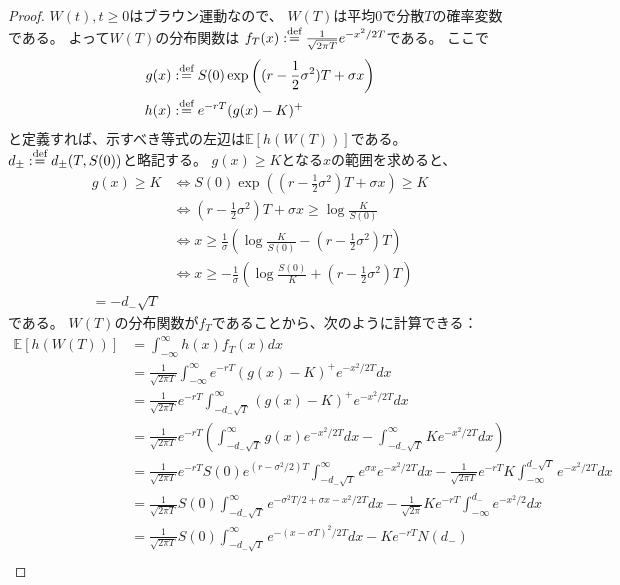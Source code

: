 \documentclass[uplatex]{jsarticle}
\theoremstyle{definition}
\def\E{\mathbb{E}}
\def\dfn{:\overset{\mbox{{\scriptsize def}}}{=}}
\begin{document}
\begin{proof}
  \(W(t) , t \geq 0\)はブラウン運動なので、
  \(W(T)\)は平均\(0\)で分散\(T\)の確率変数である。
  よって\(W(T)\)の分布関数は
  \(f_T(x) \dfn \frac{1}{\sqrt{2\pi T}}e^{-x^2/2T}\)である。
  ここで
  \begin{align*}
    g(x) &\dfn S(0)\exp\left( (r-\frac{1}{2}\sigma^2)T + \sigma x\right) \\
    h(x) &\dfn e^{-rT}(g(x) - K)^+
  \end{align*}
  と定義すれば、示すべき等式の左辺は\(\E[h(W(T))]\)である。
  \(d_{\pm} \dfn d_{\pm}(T,S(0))\)と略記する。
  \(g(x)\geq K\)となる\(x\)の範囲を求めると、
  \begin{align*}
    g(x)\geq K &\iff
    S(0)\exp\left( (r-\frac{1}{2}\sigma^2)T + \sigma x\right) \geq K \\
    &\iff (r-\frac{1}{2}\sigma^2)T + \sigma x
    \geq \log \frac{K}{S(0)} \\
    &\iff x \geq \frac{1}{\sigma}
    \left(\log \frac{K}{S(0)} - (r-\frac{1}{2}\sigma^2)T\right) \\
    &\iff x \geq -\frac{1}{\sigma}
    \left(\log \frac{S(0)}{K} + (r-\frac{1}{2}\sigma^2)T\right) \\
    = -d_-\sqrt{T}
  \end{align*}
  である。
  \(W(T)\)の分布関数が\(f_T\)であることから、次のように計算できる：
  \begin{align*}
    \E[h(W(T))] &= \int_{-\infty}^{\infty}h(x)f_T(x)dx \\
    &= \frac{1}{\sqrt{2\pi T}}\int_{-\infty}^{\infty}
    e^{-rT}(g(x) - K)^+e^{-x^2/2T}dx \\
    &= \frac{1}{\sqrt{2\pi T}}e^{-rT}\int_{-d_-\sqrt{T}}^{\infty}
    (g(x) - K)^+e^{-x^2/2T}dx \\
    &= \frac{1}{\sqrt{2\pi T}}e^{-rT}
    \left( \int_{-d_-\sqrt{T}}^{\infty}g(x)e^{-x^2/2T}dx
    - \int_{-d_-\sqrt{T}}^{\infty}Ke^{-x^2/2T}dx\right) \\
    &= \frac{1}{\sqrt{2\pi T}}e^{-rT}S(0)e^{(r-\sigma^2/2)T}
    \int_{-d_-\sqrt{T}}^{\infty}e^{\sigma x}e^{-x^2/2T}dx
    - \frac{1}{\sqrt{2\pi T}}e^{-rT}K
    \int_{-\infty}^{d_-\sqrt{T}}e^{-x^2/2T}dx \\
    &= \frac{1}{\sqrt{2\pi T}}S(0)
    \int_{-d_-\sqrt{T}}^{\infty}e^{-\sigma^2T/2 + \sigma x - x^2/2T}dx
    - \frac{1}{\sqrt{2\pi}}Ke^{-rT}
    \int_{-\infty}^{d_-}e^{-x^2/2}dx \\
    &= \frac{1}{\sqrt{2\pi T}}S(0)
    \int_{-d_-\sqrt{T}}^{\infty}e^{-(x - \sigma T)^2/2T}dx
    - Ke^{-rT}N(d_-) \\

\end{align*}
\end{proof}
\end{document}
